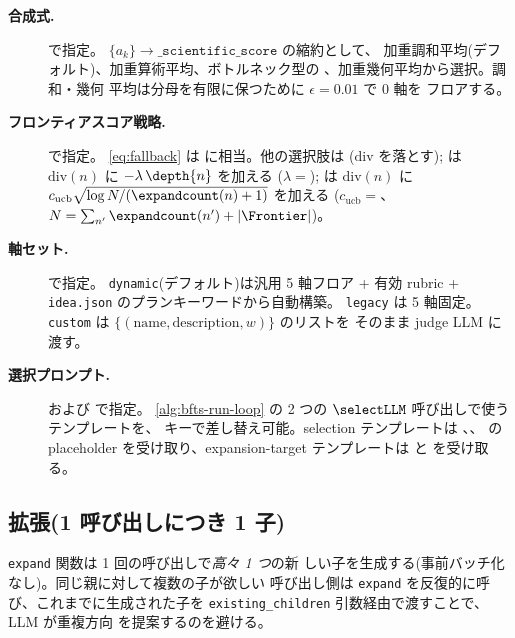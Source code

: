 \begin{description}
  \item[\textbf{合成式.}]
         で指定。
        $\{a_k\}\!\to\!\texttt{\_scientific\_score}$ の縮約として、
        加重調和平均(デフォルト)、加重算術平均、ボトルネック型の
        、加重幾何平均から選択。調和・幾何
        平均は分母を有限に保つために $\epsilon=0.01$ で 0 軸を
        フロアする。
  \item[\textbf{フロンティアスコア戦略.}]
         で指定。
        \cref{eq:fallback} は 
        に相当。他の選択肢は 
        ($\mathrm{div}$ を落とす); は
        $\mathrm{div}(n)$ に $-\lambda\,\depth{n}$ を加える
        ($\lambda=$);
         は $\mathrm{div}(n)$ に
        $c_{\mathrm{ucb}}\sqrt{\log N / (\expandcount(n)+1)}$ を加える
        ($c_{\mathrm{ucb}}=$、
        $N = \sum_{n'}\expandcount(n')+|\Frontier|$)。
  \item[\textbf{軸セット.}]
         で指定。
        \texttt{dynamic}(デフォルト)は汎用 5 軸フロア + 有効
        rubric + \texttt{idea.json} のプランキーワードから自動構築。
        \texttt{legacy} は 5 軸固定。\texttt{custom} は
        $\{(\mathrm{name},\mathrm{description},w)\}$ のリストを
        そのまま judge LLM に渡す。
  \item[\textbf{選択プロンプト.}]
         および
         で指定。
        \cref{alg:bfts-run-loop} の 2 つの $\selectLLM$
        呼び出しで使うテンプレートを、
        キーで差し替え可能。selection テンプレートは
        、、
         の placeholder を受け取り、expansion-target
        テンプレートは  と
         を受け取る。
\end{description}

\subsection{拡張(1 呼び出しにつき 1 子)}\label{sec:exploration:expansion}

\texttt{expand} 関数は 1 回の呼び出しで\emph{高々 1 つ}の新
しい子を生成する(事前バッチ化なし)。同じ親に対して複数の子が欲しい
呼び出し側は
\texttt{expand} を反復的に呼び、これまでに生成された子を
\texttt{existing\_children} 引数経由で渡すことで、LLM が重複方向
を提案するのを避ける。

